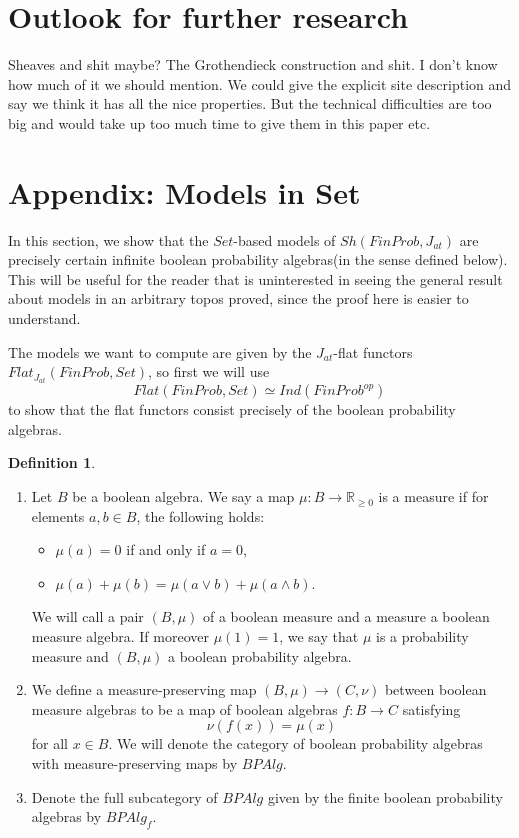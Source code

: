 \documentclass[a4paper]{amsproc}
\theoremstyle{plain}
\theoremstyle{definition}
\newtheorem{definition}[theorem]{Definition}
\theoremstyle{remark}
\numberwithin{equation}{section}
\begin{document}
\section{Outlook for further research}
Sheaves and shit maybe? The Grothendieck construction and shit. I don't know how much of it we should mention. We could give the explicit site description and say we think it has all the nice properties. But the technical difficulties are too big and would take up too much time to give them in this paper etc.
\section{Appendix: Models in Set}

In this section, we show that the $Set$-based models of $Sh(FinProb, J_{at})$ are precisely certain infinite boolean probability algebras(in the sense defined below). This will be useful for the reader that is uninterested in seeing the general result about models in an arbitrary topos proved, since the proof here is easier to understand.


The models we want to compute are given by the $J_{at}$-flat functors\linebreak
 $Flat_{J_{at}}(FinProb, Set)$, so first we will use 
\[
Flat(FinProb, Set) \simeq Ind(FinProb^{op})
\]
to show that the flat functors consist precisely of the boolean probability algebras.

\begin{definition}
\begin{enumerate}
\item Let $B$ be a boolean algebra. We say a map $\mu: B \to \mathbb{R}_{\geq 0}$ is a measure if for elements $a,b \in B$, the following holds:
\begin{itemize}
\item $\mu(a) = 0$ if and only if $a = 0 $,
\item $\mu(a) + \mu(b) = \mu(a \vee b) + \mu(a \wedge b)$.
\end{itemize}
We will call a pair $(B, \mu)$ of a boolean measure and a measure a boolean measure algebra. If moreover $\mu(1) = 1$, we say that $\mu$ is a  probability measure and $(B,\mu)$ a boolean probability algebra.
\item We define a measure-preserving map $(B, \mu) \to (C, \nu)$ between boolean measure algebras to be a map of boolean algebras $f: B \to C$ satisfying
\[
\nu(f(x)) = \mu(x)
\]
for all $x \in B$. We will denote the category of boolean probability algebras with measure-preserving maps by $BPAlg$.
\item Denote the full subcategory of $BPAlg$ given by the finite boolean probability algebras by $BPAlg_f$.
\end{enumerate}
\end{definition}
\end{document}
